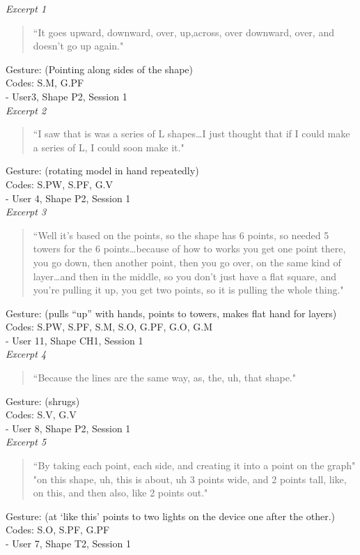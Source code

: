 \emph{Excerpt 1}

\begin{quotation}
``It goes upward, downward, over, up,across, over downward, over, and doesn't
go up again."
\end{quotation}
Gesture: (Pointing along sides of the shape)\\
Codes: S.M, G.PF \\ 
- User3, Shape P2, Session 1\\


\emph{Excerpt 2}

\begin{quotation}
``I saw that is was a series of L shapes\ldots I just thought that if I
could make a series of L, I could soon make it." 
\end{quotation} 
Gesture: (rotating model in hand repeatedly)\\
Codes: S.PW, S.PF, G.V\\ 
- User 4, Shape P2, Session 1\\

\emph{Excerpt 3}

\begin{quotation}
``Well it's based on the points, so the shape has 6 points, so needed 5
towers for the 6 points\ldots because of how to works you get one point there, you go
down, then another point, then you go over, on the same kind of layer\ldots and
then in the middle, so you don't just have a flat square, and you're pulling it up, you get
two points, so it is pulling the whole thing."
\end{quotation} 
Gesture: (pulls ``up'' with hands, points to towers, makes flat hand for
layers)\\
Codes: S.PW, S.PF, S.M, S.O, G.PF, G.O, G.M\\ 
- User 11, Shape CH1, Session 1\\

\emph{Excerpt 4}

\begin{quotation}
``Because the lines are the same way, as, the, uh, that shape."
\end{quotation}
Gesture: (shrugs)\\
Codes: S.V, G.V\\ 
- User 8, Shape P2, Session 1\\

\emph{Excerpt 5}

\begin{quotation}
``By taking each point, each side, and creating it into a point on the
graph" "on this shape, uh, this is about, uh 3 points wide, and 2 points tall, like, on
this, and then also, like 2 points out."
\end{quotation}
Gesture: (at `like this' points to two lights on the device one after the
other.)\\
Codes: S.O, S.PF, G.PF \\
- User 7, Shape T2, Session 1\\

